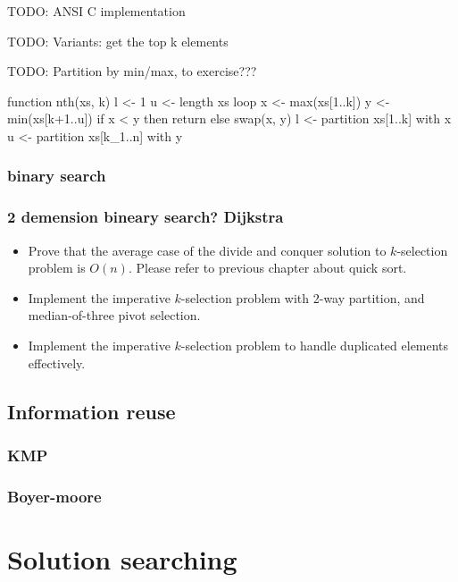 \documentclass{article}
\begin{document}
TODO: ANSI C implementation

TODO: Variants: get the top k elements

TODO: Partition by min/max, to exercise???

function nth(xs, k)
  l <- 1
  u <- length xs
  loop
    x <- max(xs[1..k])
    y <- min(xs[k+1..u])
    if x < y then
      return
    else
      swap(x, y)
      l <- partition xs[1..k] with x
      u <- partition xs[k_1..n] with y 

\subsubsection{binary search}

\subsubsection{2 demension bineary search? Dijkstra}

\begin{Exercise}
\begin{itemize}
\item Prove that the average case of the divide and conquer solution to $k$-selection problem is $O(n)$. Please refer to previous chapter about quick sort.
\item Implement the imperative $k$-selection problem with 2-way partition, and median-of-three pivot selection.
\item Implement the imperative $k$-selection problem to handle duplicated elements effectively.
\end{itemize}
\end{Exercise}

\subsection{Information reuse}

\subsubsection{KMP}

\subsubsection{Boyer-moore}

\section{Solution searching}
\end{document}
